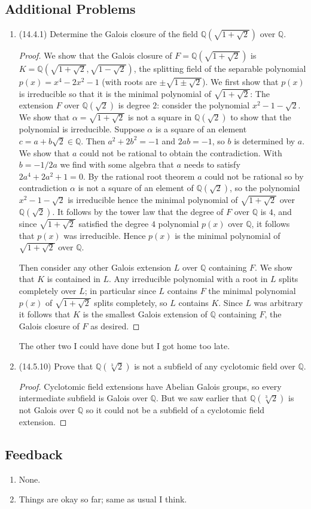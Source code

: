 \documentclass[11pt]{article}
\begin{document}
\subsection*{Additional Problems}
\begin{enumerate}
    \item (14.4.1) Determine the Galois closure of the field $\mathbb{Q}(\sqrt{1+\sqrt{2}})$ over $\mathbb{Q}$. \begin{proof}
        We show that the Galois closure of $F = \mathbb{Q}(\sqrt{1+\sqrt{2}})$ is $K=\mathbb{Q}(\sqrt{1+\sqrt{2}},\sqrt{1-\sqrt{2}})$, the splitting field of the separable polynomial $p(x) = x^4-2x^2-1$ (with roots are $\pm\sqrt{1\pm\sqrt{2}}$). We first show that $p(x)$ is irreducible so that it is the minimal polynomial of $\sqrt{1+\sqrt{2}}$: The extension $F$ over $\mathbb{Q}(\sqrt{2})$ is degree $2$: consider the polynomial $x^2-1-\sqrt{2}$. We show that $\alpha = \sqrt{1+\sqrt{2}}$ is not a square in $\mathbb{Q}(\sqrt{2})$ to show that the polynomial is irreducible. Suppose $\alpha$ is a square of an element $c = a+b\sqrt{2}\in\mathbb{Q}$. Then $a^2+2b^2 = -1$ and $2ab = -1$, so $b$ is determined by $a$. We show that $a$ could not be rational to obtain the contradiction. With $b = -1/2a$ we find with some algebra that $a$ needs to satisfy $2a^4+2a^2+1 = 0$. By the rational root theorem $a$ could not be rational so by contradiction $\alpha$ is not a square of an element of $\mathbb{Q}(\sqrt{2})$, so the polynomial $x^2-1-\sqrt{2}$ is irreducible hence the minimal polynomial of $\sqrt{1+\sqrt{2}}$ over $\mathbb{Q}(\sqrt{2})$. It follows by the tower law that the degree of $F$ over $\mathbb{Q}$ is $4$, and since $\sqrt{1+\sqrt{2}}$ satisfied the degree $4$ polynomial $p(x)$ over $\mathbb{Q}$, it follows that $p(x)$ was irreducible. Hence $p(x)$ is the minimal polynomial of $\sqrt{1+\sqrt{2}}$ over $\mathbb{Q}$.

        Then consider any other Galois extension $L$ over $\mathbb{Q}$ containing $F$. We show that $K$ is contained in $L$. Any irreducible polynomial with a root in $L$ splits completely over $L$; in particular since $L$ contains $F$ the minimal polynomial $p(x)$ of $\sqrt{1+\sqrt{2}}$ splits completely, so $L$ contains $K$. Since $L$ was arbitrary it follows that $K$ is the smallest Galois extension of $\mathbb{Q}$ containing $F$, the Galois closure of $F$ as desired.
    \end{proof}
    The other two I could have done but I got home too late.
    \item (14.5.10) Prove that $\mathbb{Q}(\sqrt[3]{2})$ is not a subfield of any cyclotomic field over $\mathbb{Q}$. \begin{proof}
        Cyclotomic field extensions have Abelian Galois groups, so every intermediate subfield is Galois over $\mathbb{Q}$. But we saw earlier that $\mathbb{Q}(\sqrt[3]{2})$ is not Galois over $\mathbb{Q}$ so it could not be a subfield of a cyclotomic field extension.
    \end{proof}
\end{enumerate}
\subsection*{Feedback}
\begin{enumerate}
    \item None.
    \item Things are okay so far; same as usual I think.
\end{enumerate}
\end{document}
